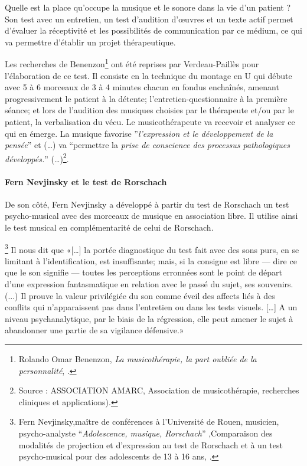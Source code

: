 Quelle est la place qu'occupe la musique et le sonore dans la vie d'un patient ? Son test avec un entretien, un test d'audition d'\oe uvres et un texte actif permet d'évaluer la réceptivité et les possibilités de communication par ce médium, ce qui va permettre d'établir un projet thérapeutique.

Les recherches de Benenzon\footnote{Rolando Omar
  Benenzon, \emph{La musicothérapie, la part oubliée de la
    personnalité}, \cite{Benenzon2007}.} ont été reprises par
Verdeau-Paillès pour l'élaboration de ce test. Il consiste en la technique du montage en U qui débute avec 5 à 6 morceaux de 3 à 4 minutes chacun en fondus enchaînés, amenant progressivement le patient à la détente;   l'entretien-questionnaire à la première
séance;  et lors de l'audition des musiques choisies par le thérapeute
et/ou par le patient, la verbalisation du vécu. Le musicothérapeute
va recevoir et analyser ce qui en émerge. 
La musique favorise  ''\emph{l'expression et le développement
	de la pensée}'' et (\ldots) va ``permettre la \emph{prise de conscience
	des processus pathologiques développés.}''
  (\ldots)\footnote{Source : ASSOCIATION AMARC,
  Association de musicothérapie, recherches cliniques et
  applications). }.


 \paragraph{Fern Nevjinsky et le test de Rorschach}
 De son côté, Fern Nevjinsky a développé à partir du  test de Rorschach un test psycho-musical avec des morceaux
de musique en association libre. Il utilise ainsi le test
musical en complémentarité de celui de Rorschach.

 
\footnote{Fern Nevjinsky,maître de conférences à l'Université de Rouen, musicien, psycho-analyste ``\emph{Adolescence, musique, Rorschach}'' ,Comparaison des modalités de projection et d'expression au test de Rorschach et à un test psycho-musical pour des adolescents de 13 à 16 ans,
  \cite{Nevjinsky1996}.} Il nous dit  que  «[\ldots] la
portée diagnostique du test fait avec des sons purs, en se limitant à
l'identification, est insuffisante; mais, si la consigne est libre ---
dire ce que le son signifie --- toutes les perceptions erronnées sont
le point de départ d'une expression fantasmatique en relation avec le
passé du sujet, ses souvenirs. (...) Il prouve  la valeur privilégiée du son comme éveil
des affects liés à des conflits qui n'apparaissent pas dans
l'entretien ou dans les tests visuels.  [\ldots] A un niveau
psychanalytique, par le biais de la régression, elle peut amener le sujet à abandonner une partie de sa vigilance défensive.»

